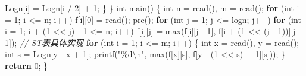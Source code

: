 \documentclass[
]{article}
\newenvironment{Shaded}{}{}
\newcommand{\CommentTok}[1]{\textcolor[rgb]{0.38,0.63,0.69}{\textit{#1}}}
\newcommand{\ControlFlowTok}[1]{\textcolor[rgb]{0.00,0.44,0.13}{\textbf{#1}}}
\newcommand{\DataTypeTok}[1]{\textcolor[rgb]{0.56,0.13,0.00}{#1}}
\newcommand{\DecValTok}[1]{\textcolor[rgb]{0.25,0.63,0.44}{#1}}
\newcommand{\NormalTok}[1]{#1}
\newcommand{\OperatorTok}[1]{\textcolor[rgb]{0.40,0.40,0.40}{#1}}
\newcommand{\SpecialCharTok}[1]{\textcolor[rgb]{0.25,0.44,0.63}{#1}}
\newcommand{\StringTok}[1]{\textcolor[rgb]{0.25,0.44,0.63}{#1}}
\begin{document}
\begin{Shaded}
\begin{Highlighting}[]
\NormalTok{    Logn}\OperatorTok{[}\NormalTok{i}\OperatorTok{]} \OperatorTok{=}\NormalTok{ Logn}\OperatorTok{[}\NormalTok{i }\OperatorTok{/} \DecValTok{2}\OperatorTok{]} \OperatorTok{+} \DecValTok{1}\OperatorTok{;}
  \OperatorTok{\}}
\OperatorTok{\}}
\DataTypeTok{int}\NormalTok{ main}\OperatorTok{()} \OperatorTok{\{}
  \DataTypeTok{int}\NormalTok{ n }\OperatorTok{=}\NormalTok{ read}\OperatorTok{(),}\NormalTok{ m }\OperatorTok{=}\NormalTok{ read}\OperatorTok{();}
  \ControlFlowTok{for} \OperatorTok{(}\DataTypeTok{int}\NormalTok{ i }\OperatorTok{=} \DecValTok{1}\OperatorTok{;}\NormalTok{ i }\OperatorTok{\textless{}=}\NormalTok{ n}\OperatorTok{;}\NormalTok{ i}\OperatorTok{++)}\NormalTok{ f}\OperatorTok{[}\NormalTok{i}\OperatorTok{][}\DecValTok{0}\OperatorTok{]} \OperatorTok{=}\NormalTok{ read}\OperatorTok{();}
\NormalTok{  pre}\OperatorTok{();}
  \ControlFlowTok{for} \OperatorTok{(}\DataTypeTok{int}\NormalTok{ j }\OperatorTok{=} \DecValTok{1}\OperatorTok{;}\NormalTok{ j }\OperatorTok{\textless{}=}\NormalTok{ logn}\OperatorTok{;}\NormalTok{ j}\OperatorTok{++)}
    \ControlFlowTok{for} \OperatorTok{(}\DataTypeTok{int}\NormalTok{ i }\OperatorTok{=} \DecValTok{1}\OperatorTok{;}\NormalTok{ i }\OperatorTok{+} \OperatorTok{(}\DecValTok{1} \OperatorTok{\textless{}\textless{}}\NormalTok{ j}\OperatorTok{)} \OperatorTok{{-}} \DecValTok{1} \OperatorTok{\textless{}=}\NormalTok{ n}\OperatorTok{;}\NormalTok{ i}\OperatorTok{++)}
\NormalTok{      f}\OperatorTok{[}\NormalTok{i}\OperatorTok{][}\NormalTok{j}\OperatorTok{]} \OperatorTok{=}\NormalTok{ max}\OperatorTok{(}\NormalTok{f}\OperatorTok{[}\NormalTok{i}\OperatorTok{][}\NormalTok{j }\OperatorTok{{-}} \DecValTok{1}\OperatorTok{],}\NormalTok{ f}\OperatorTok{[}\NormalTok{i }\OperatorTok{+} \OperatorTok{(}\DecValTok{1} \OperatorTok{\textless{}\textless{}} \OperatorTok{(}\NormalTok{j }\OperatorTok{{-}} \DecValTok{1}\OperatorTok{))][}\NormalTok{j }\OperatorTok{{-}} \DecValTok{1}\OperatorTok{]);}  \CommentTok{// ST表具体实现}
  \ControlFlowTok{for} \OperatorTok{(}\DataTypeTok{int}\NormalTok{ i }\OperatorTok{=} \DecValTok{1}\OperatorTok{;}\NormalTok{ i }\OperatorTok{\textless{}=}\NormalTok{ m}\OperatorTok{;}\NormalTok{ i}\OperatorTok{++)} \OperatorTok{\{}
    \DataTypeTok{int}\NormalTok{ x }\OperatorTok{=}\NormalTok{ read}\OperatorTok{(),}\NormalTok{ y }\OperatorTok{=}\NormalTok{ read}\OperatorTok{();}
    \DataTypeTok{int}\NormalTok{ s }\OperatorTok{=}\NormalTok{ Logn}\OperatorTok{[}\NormalTok{y }\OperatorTok{{-}}\NormalTok{ x }\OperatorTok{+} \DecValTok{1}\OperatorTok{];}
\NormalTok{    printf}\OperatorTok{(}\StringTok{"}\SpecialCharTok{\%d\textbackslash{}n}\StringTok{"}\OperatorTok{,}\NormalTok{ max}\OperatorTok{(}\NormalTok{f}\OperatorTok{[}\NormalTok{x}\OperatorTok{][}\NormalTok{s}\OperatorTok{],}\NormalTok{ f}\OperatorTok{[}\NormalTok{y }\OperatorTok{{-}} \OperatorTok{(}\DecValTok{1} \OperatorTok{\textless{}\textless{}}\NormalTok{ s}\OperatorTok{)} \OperatorTok{+} \DecValTok{1}\OperatorTok{][}\NormalTok{s}\OperatorTok{]));}
  \OperatorTok{\}}
  \ControlFlowTok{return} \DecValTok{0}\OperatorTok{;}
\OperatorTok{\}}
\end{Highlighting}
\end{Shaded}
\end{document}
